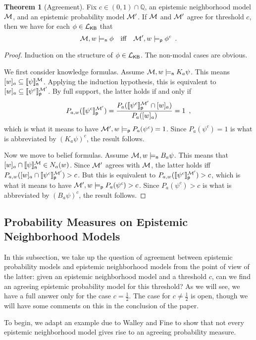 \documentclass[12pt]{article}
\theoremstyle{definition}
\newtheorem{theorem}{Theorem}[section]
\newcommand{\Rat}{\mathbb{Q}}  %
\newcommand{\M}{{\cal M}}      %
\newcommand{\Lang}{{\cal L}}   %
\newcommand{\KB}{{\mathsf{KB}}}                        %
\newcommand{\modelsn}{\models_{\mathsf{n}}}                  %
\newcommand{\semn}[1]{\llbracket{#1}\rrbracket_{\mathsf{n}}} %
\newcommand{\modelsp}{\models_{\mathsf{p}}}                  %
\newcommand{\semp}[1]{\llbracket{#1}\rrbracket_{\mathsf{p}}} %
\begin{document}
\begin{theorem}[Agreement]
  \label{theorem:agreement}\label{BettingTheorem}
  Fix $c\in(0,1)\cap\Rat$, an epistemic neighborhood model $\M$, and
  an epistemic probability model $\M'$. If $\M$ and $\M'$ agree for
  threshold $c$, then we have for each $\phi \in \Lang_\KB$ that
  \[
  \M,w\modelsn\phi \quad\text{iff}\quad
  \M',w\modelsp\phi^c\enspace.
  \]
\end{theorem}
\begin{proof}
  Induction on the structure of $\phi\in\Lang_\KB$. The non-modal
  cases are obvious.

  We first consider knowledge formulas. Assume $\M,w \modelsn
  K_a\psi$.  This means $[w]_a\subseteq\semn{\psi}^{\M}$. Applying the
  induction hypothesis, this is equivalent to
  $[w]_a\subseteq\semp{\psi^c}^{\M'}$.  By full support, the latter
  holds if and only if
  \[
  P_{a,w}(\semp{\psi^c}^{\M'}) =
  \frac{P_a(\semp{\psi^c}^{\M'}\cap[w]_a)}{P_a([w]_a)}=1 \enspace,
  \]
  which is what it means to have $\M',w\modelsp P_a(\psi^c)=1$.  Since
  $P_a(\psi^c)=1$ is what is abbreviated by $(K_a\psi)^c$, the result
  follows.

  Now we move to belief formulas. Assume $\M,w \modelsn B_a\psi$.
  This means that $[w]_a\cap\semn{\psi}^{\M}\in N_a(w)$.  Since $\M'$
  agrees with $\M$, the latter holds iff
  $P_{a,w}([w]_a\cap\semp{\psi^c}^{\M'})>c$.  But this is equivalent
  to $P_{a,w}(\semp{\psi^c}^{\M'})>c$, which is what it means to have
  $\M',w \modelsp P_a(\psi^c)>c$.  Since $P_a(\psi^c)>c$ is what is
  abbreviated by $(B_a\psi)^c$, the result follows.
\end{proof}


\subsection{Probability Measures on Epistemic Neighborhood Models}

In this subsection, we take up the question of agreement between
epistemic probability models and epistemic neighborhood models from
the point of view of the latter: given an epistemic neighborhood model
and a threshold $c$, can we find an agreeing epistemic probability
model for this threshold? As we will see, we have a full answer only
for the case $c=\frac 12$.  The case for $c\neq\frac 12$ is open,
though we will have some comments on this in the conclusion of the
paper.

To begin, we adapt an example due to Walley and Fine
\cite{WalleyFine1979:vomacp} to show that not every epistemic
neighborhood model gives rise to an agreeing probability measure.
\end{document}
